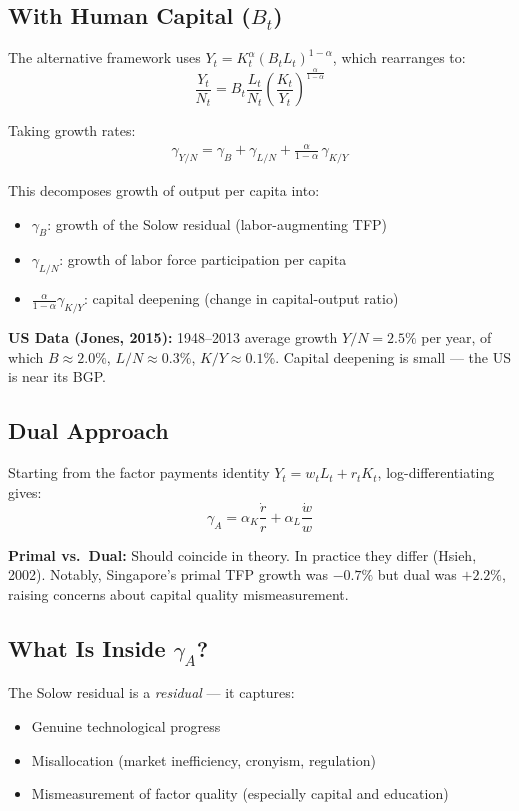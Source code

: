 \documentclass[a4paper,11pt]{article}
\newcommand{\gA}{\gamma_{A}}
\begin{document}
\subsection*{With Human Capital ($B_t$)}

The alternative framework uses $Y_t = K_t^\alpha (B_t L_t)^{1-\alpha}$, which rearranges to:
\[
\frac{Y_t}{N_t} = B_t \frac{L_t}{N_t} \left(\frac{K_t}{Y_t}\right)^{\frac{\alpha}{1-\alpha}}
\]

Taking growth rates:
\begin{align*}
\gamma_{Y/N} = \gamma_B + \gamma_{L/N} + \frac{\alpha}{1-\alpha}\,\gamma_{K/Y}
\tag{Alt. Decomposition}
\end{align*}

This decomposes growth of output per capita into:
\begin{itemize}[noitemsep]
    \item $\gamma_B$: growth of the Solow residual (labor-augmenting TFP)
    \item $\gamma_{L/N}$: growth of labor force participation per capita
    \item $\frac{\alpha}{1-\alpha}\gamma_{K/Y}$: capital deepening (change in capital-output ratio)
\end{itemize}

\begin{resultbox}
\textbf{US Data (Jones, 2015):} 1948--2013 average growth $Y/N = 2.5\%$ per year, of which $B \approx 2.0\%$, $L/N \approx 0.3\%$, $K/Y \approx 0.1\%$. Capital deepening is small --- the US is near its BGP.
\end{resultbox}

\subsection*{Dual Approach}

Starting from the factor payments identity $Y_t = w_t L_t + r_t K_t$, log-differentiating gives:
\[
\gA = \alpha_K \frac{\dot{r}}{r} + \alpha_L \frac{\dot{w}}{w}
\tag{Dual TFP}
\]

\begin{tcolorbox}[colback=orange!10, colframe=orange3]
\textbf{Primal vs.\ Dual:} Should coincide in theory. In practice they differ (Hsieh, 2002). Notably, Singapore's primal TFP growth was $-0.7\%$ but dual was $+2.2\%$, raising concerns about capital quality mismeasurement.
\end{tcolorbox}

\subsection*{What Is Inside $\gamma_A$?}
The Solow residual is a \textit{residual} --- it captures:
\begin{itemize}[noitemsep]
    \item Genuine technological progress
    \item Misallocation (market inefficiency, cronyism, regulation)
    \item Mismeasurement of factor quality (especially capital and education)
\end{itemize}
\end{document}

